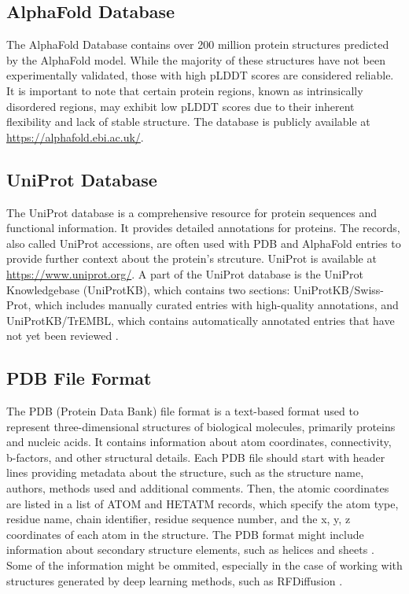 \subsection{AlphaFold Database}
\label{sec:alphafold-db}

The AlphaFold Database \cite{varadi2024alphafold} contains over 200 million protein structures predicted by the AlphaFold model. While the majority of these structures have not been experimentally validated, those with high pLDDT scores are considered reliable. It is important to note that certain protein regions, known as intrinsically disordered regions, may exhibit low pLDDT scores due to their inherent flexibility and lack of stable structure. The database is publicly available at \url{https://alphafold.ebi.ac.uk/}.

\subsection{UniProt Database}
\label{sec:uniprot-db}

The UniProt database \cite{uniprot2025uniprot} is a comprehensive resource for protein sequences and functional information. It provides detailed annotations for proteins. The records, also called UniProt accessions, are often used with PDB and AlphaFold entries to provide further context about the protein's strcuture. UniProt is available at \url{https://www.uniprot.org/}. A part of the UniProt database is the UniProt Knowledgebase (UniProtKB), which contains two sections: UniProtKB/Swiss-Prot, which includes manually curated entries with high-quality annotations, and UniProtKB/TrEMBL, which contains automatically annotated entries that have not yet been reviewed \cite{boutet2016uniprotkb}.

\subsection{PDB File Format}
\label{sec:pdb-format}

The PDB (Protein Data Bank) file format is a text-based format used to represent three-dimensional structures of biological molecules, primarily proteins and nucleic acids. It contains information about atom coordinates, connectivity, b-factors, and other structural details. Each PDB file should start with header lines providing metadata about the structure, such as the structure name, authors, methods used and additional comments. Then, the atomic coordinates are listed in a list of ATOM and HETATM records, which specify the atom type, residue name, chain identifier, residue sequence number, and the x, y, z coordinates of each atom in the structure. The PDB format might include information about secondary structure elements, such as helices and sheets \cite{westbrook2003pdb}. Some of the information might be ommited, especially in the case of working with structures generated by deep learning methods, such as RFDiffusion \cite{watson2023novo}.

